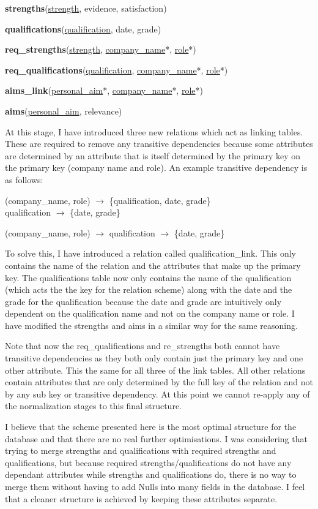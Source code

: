 \documentclass{article}
\begin{document}
\textbf{strengths}(\underline{strength}, evidence, satisfaction)

\textbf{qualifications}(\underline{qualification}, date, grade)

\textbf{req\_strengths}(\underline{strength}, \underline{company\_name}*, \underline{role}*)

\textbf{req\_qualifications}(\underline{qualification}, \underline{company\_name}*, \underline{role}*)

\textbf{aims\_link}(\underline{personal\_aim}*, \underline{company\_name}*, \underline{role}*)

\textbf{aims}(\underline{personal\_aim}, relevance)

At this stage, I have introduced three new relations which act as linking tables. These are required to remove any transitive dependencies because some attributes are determined by an attribute that is itself determined by the primary key on the primary key (company name and role). An example transitive dependency is as follows:

(company\_name, role) $\rightarrow$ \{qualification, date, grade\}\\
qualification $\rightarrow$ \{date, grade\}

(company\_name, role) $\rightarrow$ qualification $\rightarrow$ \{date, grade\}

To solve this, I have introduced a relation called qualification\_link. This only contains the name of the relation and the attributes that make up the primary key. The qualifications table now only contains the name of the qualification (which acts the the key for the relation scheme) along with the date and the grade for the qualification because the date and grade are intuitively only dependent on the qualification name and not on the company name or role. I have modified the strengths and aims in a similar way for the same reasoning.

Note that now the req\_qualifications and re\_strengths both cannot have transitive dependencies as they both only contain just the primary key and one other attribute. This the same for all three of the link tables. All other relations contain attributes that are only determined by the full key of the relation and not by any sub key or transitive dependency. At this point we cannot re-apply any of the normalization stages to this final structure. 

I believe that the scheme presented here is the most optimal structure for the database and that there are no real further optimisations. I was considering that trying to merge strengths and qualifications with required strengths and qualifications, but because required strengths/qualifications do not have any dependant attributes while strengths and qualifications do, there is no way to merge them without having to add Nulls into many fields in the database. I feel that a cleaner structure is achieved by keeping these attributes separate.
\end{document}
